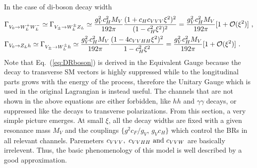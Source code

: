 \newline In the case of di-boson decay width
\begin{align}
  \label{eq:DRboson}
  &\Gamma_{V_{0}\rightarrow W_{L}^{+}W_{L}^{-}}\simeq\Gamma_{V_{\pm}\rightarrow W_{L}^{\pm}Z_{L}}\simeq\frac{g_{V}^{2}c_{H}^{2}M_{V}}{192\pi}\frac{(1+c_{H}c_{VVV}\xi^{2})^{2}}{(1-c_{H}^{2}\xi^{2})^{2}}=\frac{g_{V}^{2}c_{H}^{2}M_{V}}{192\pi}[1+\mathcal{O}(\xi^{2})]\textup{ ,}\nonumber\\
  &\Gamma_{V_{0}\rightarrow Z_{L}h}\simeq\Gamma_{V_{\pm}\rightarrow W_{L}^{\pm}h}\simeq\frac{g_{V}^{2}c_{H}^{2}M_{V}}{192\pi}\frac{(1-4c_{VVHH}\xi^{2})^{2}}{1-c_{H}^{2}\xi^{2}}=\frac{g_{V}^{2}c_{H}^{2}M_{V}}{192\pi}[1+\mathcal{O}(\xi^{2})]\textup{ .}\nonumber\\
\end{align}
Note that Eq.~(\ref{eq:DRboson}) is derived in the Equivalent Gauge\cite{EquivGauge} because the decay to transverse SM vectors is highly suppressed while to the longitudinal parts grows with the energy of the process, therefore the Unitary Gauge which is used in the original Lagrangian is instead useful. The channels that are not shown in the above equations are either forbidden, like $hh$ and $\gamma\gamma$ decays, or suppressed like the decays to transverse polarizations.
\newline From this section, a very simple picture emerges. At small $\xi$, all the decay widths are fixed with a given resonance mass $M_{V}$ and the couplings $\{g^{2}c_{F}/g_{V}$, $g_{V}c_{H}\}$ which control the BRs in all relevant channels. Paremeters $c_{VVV},\textup{ } c_{VVHH}\textup{ and }c_{VVW}$ are basically irrelevent. Thus, the basic phenomenology of this model is well described by a good approximation.


\newpage
